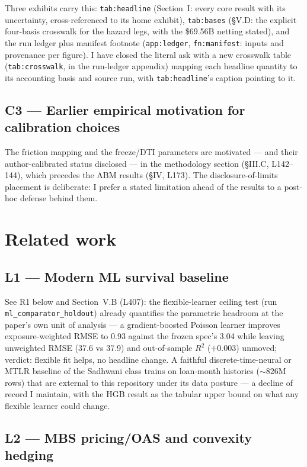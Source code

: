 \documentclass[11pt]{article}
\newcommand{\mlabel}[1]{\texttt{#1}}
\newcommand{\run}[1]{\texttt{#1}}
\begin{document}
Three exhibits carry this: \mlabel{tab:headline} (Section~I: every core result
with its uncertainty, cross-referenced to its home exhibit),
\mlabel{tab:bases} (\S V.D: the explicit four-basis crosswalk for the hazard
legs, with the \$69.56B netting stated), and the run ledger plus manifest
footnote (\mlabel{app:ledger}, \mlabel{fn:manifest}: inputs and provenance per
figure). I have closed the literal ask with a new crosswalk table
(\mlabel{tab:crosswalk}, in the run-ledger appendix) mapping each headline
quantity to its accounting basis and source run, with \mlabel{tab:headline}'s
caption pointing to it.

\subsection*{C3 --- Earlier empirical motivation for calibration choices}

The friction mapping and the freeze/DTI parameters are motivated --- and their
author-calibrated status disclosed --- in the methodology section (\S III.C,
L142--144), which precedes the ABM results (\S IV, L173). The
disclosure-of-limits placement is deliberate: I prefer a stated limitation
ahead of the results to a post-hoc defense behind them.

\section*{Related work}

\subsection*{L1 --- Modern ML survival baseline}

See R1 below and Section~V.B (L407): the flexible-learner ceiling test (run
\run{ml\_comparator\_holdout}) already quantifies the parametric headroom at
the paper's own unit of analysis --- a gradient-boosted Poisson learner
improves exposure-weighted RMSE to 0.93 against the frozen spec's 3.04 while
leaving unweighted RMSE (37.6 vs 37.9) and out-of-sample $R^2$ ($+0.003$)
unmoved; verdict: flexible fit helps, no headline change. A faithful
discrete-time-neural or MTLR baseline of the Sadhwani class trains on
loan-month histories (${\sim}826$M rows) that are external to this repository
under its data posture --- a decline of record I maintain, with the HGB result
as the tabular upper bound on what any flexible learner could change.

\subsection*{L2 --- MBS pricing/OAS and convexity hedging}
\end{document}
